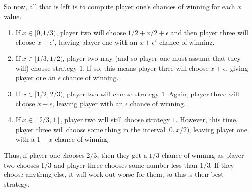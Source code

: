 \documentclass[11pt]{article}
\theoremstyle{definition}
\begin{document}
So now, all that is left is to compute player one's chances of winning for each $x$ value.
\begin{enumerate}
\item If $x \in [0, 1/3)$, player two will choose $1/2 + x/2 + \epsilon$ and then player three will choose $x + \epsilon'$, leaving player one with an $x + \epsilon'$ chance of winning.
\item If $x \in [1/3, 1/2)$, player two may (and so player one must assume that they will) choose strategy $1$.  If so, this means player three will choose $x+\epsilon$, giving player one an $\epsilon$ chance of winning.
\item If $x \in [1/2, 2/3)$, player two will choose strategy $1$.  Again, player three will choose $x+ \epsilon$, leaving player with an $\epsilon$ chance of winning.
\item If $x \in [2/3, 1]$, player two will still choose strategy $1$.  However, this time, player three will choose some thing in the interval $[0, x/2)$, leaving player one with a $1-x$ chance of winning.
\end{enumerate}
Thus, if player one chooses $2/3$, then they get a $1/3$ chance of winning as player two chooses $1/3$ and player three chooses some number less than $1/3$.  If they choose anything else, it will work out worse for them, so this is their best strategy.
\end{document}
